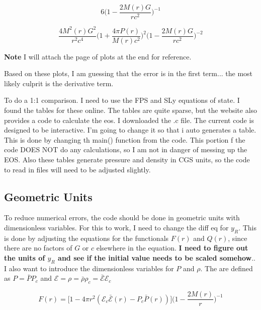 \documentclass[11pt]{article}
\numberwithin{equation}{section}
\begin{document}
\begin{equation}
6 \bigg( 1- \frac{2 M(r) G}{r c^{2}}  \bigg)^{-1}
\end{equation}

\begin{equation}
\frac{4 M^{2}(r) G^{2}}{r^{2}c^{4}} \bigg( 1 + \frac{4 \pi P(r)}{M(r) c^{2}}  \bigg)^{2} \bigg( 1 - \frac{2 M(r) G}{r c^{2}} \bigg)^{-2}
\end{equation}

\textbf{Note} I will attach the page of plots at the end for reference.  

Based on these plots, I am guessing that the error is in the first term... the most likely culprit is the derivative term.

To do a 1:1 comparison. I need to use the FPS and SLy equations of state.  I found the tables for these online.  The tables are quite sparse, but the website also provides a code to calculate the eos.  I downloaded the .c file.  The current code is designed to be interactive.  I'm going to change it so that i auto generates a table.  This is done by changing th main() function from the code.  This portion f the code DOES NOT do any calculations, so I am not in danger of messing up the EOS.  Also these tables generate pressure and density in CGS units, so the code to read in files will need to be adjusted slightly.  





\subsection{Geometric Units} 

To reduce numerical errors, the code should be done in geometric units with dimensionless variables.  For this to work, I need to change the diff eq for $y_R$.  This is done by adjusting the equations  for the functionals $F(r)$ and $Q(r)$, since there are no factors of $G$ or $c$ elsewhere in the equation. \textbf{I need to figure out the units of $y_R$ and see if the initial value needs to be scaled somehow}..  I also want to introduce the dimensionless variables for $P$ and $\rho$.  The are defined as $P = \bar{P} P_c$ and $\mathcal{E} = \rho = \bar{\rho} \rho_{c} = \bar{\mathcal{E}} \mathcal{E}_{c}$

\begin{equation} 
F(r) = \bigg[ 1- 4 \pi r^{2} (\mathcal{E}_{c}\bar{\mathcal{E}}(r)-P_{c}\bar{P}(r))  \bigg] \bigg( 1-\frac{2 M(r) }{r}  \bigg)^{-1}
\end{equation}
\end{document}
